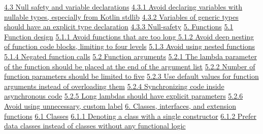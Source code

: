 \hspace{0.5cm}\hyperref[sec:4.3]{ 4.3 Null safety and variable declarations}
\hspace{1.0cm}\hyperref[sec:4.3.1]{ 4.3.1 Avoid declaring variables with nullable types, especially from Kotlin stdlib}
\hspace{1.0cm}\hyperref[sec:4.3.2]{ 4.3.2 Variables of generic types should have an explicit type declaration}
\hspace{1.0cm}\hyperref[sec:4.3.3]{ 4.3.3 Null-safety}
\hspace{0.0cm}\hyperref[sec:5.]{5. Functions}
\hspace{0.5cm}\hyperref[sec:5.1]{ 5.1 Function design}
\hspace{1.0cm}\hyperref[sec:5.1.1]{ 5.1.1 Avoid functions that are too long }
\hspace{1.0cm}\hyperref[sec:5.1.2]{ 5.1.2 Avoid deep nesting of function code blocks, limiting to four levels}
\hspace{1.0cm}\hyperref[sec:5.1.3]{ 5.1.3 Avoid using nested functions}
\hspace{1.0cm}\hyperref[sec:5.1.4]{ 5.1.4 Negated function calls}
\hspace{0.5cm}\hyperref[sec:5.2]{ 5.2 Function arguments}
\hspace{1.0cm}\hyperref[sec:5.2.1]{ 5.2.1 The lambda parameter of the function should be placed at the end of the argument list}
\hspace{1.0cm}\hyperref[sec:5.2.2]{ 5.2.2 Number of function parameters should be limited to five}
\hspace{1.0cm}\hyperref[sec:5.2.3]{ 5.2.3 Use default values for function arguments instead of overloading them}
\hspace{1.0cm}\hyperref[sec:5.2.4]{ 5.2.4 Synchronizing code inside asynchronous code}
\hspace{1.0cm}\hyperref[sec:5.2.5]{ 5.2.5 Long lambdas should have explicit parameters}
\hspace{1.0cm}\hyperref[sec:5.2.6]{ 5.2.6 Avoid using unnecessary, custom label}
\hspace{0.0cm}\hyperref[sec:6.]{6. Classes, interfaces, and extension functions}
\hspace{0.5cm}\hyperref[sec:6.1]{ 6.1 Classes}
\hspace{1.0cm}\hyperref[sec:6.1.1]{ 6.1.1 Denoting a class with a single constructor}
\hspace{1.0cm}\hyperref[sec:6.1.2]{ 6.1.2 Prefer data classes instead of classes without any functional logic}
